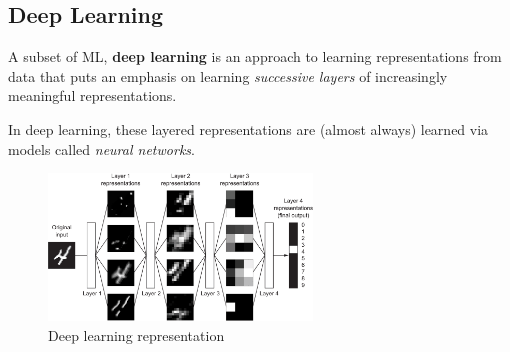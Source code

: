 \subsection{Deep Learning}

A subset of ML, \textbf{deep learning} is an approach to learning representations from data that puts an emphasis on learning \textit{successive layers} of increasingly meaningful representations.

In deep learning, these layered representations are (almost always) learned via models called \textit{neural networks}.

\begin{figure}[h]
    \centering
    \includegraphics[width=7cm]{dl}
    \caption{Deep learning representation}
    \label{fig:dl}
\end{figure}





